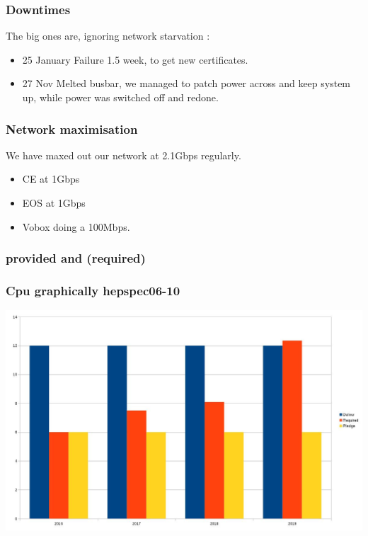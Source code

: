 \documentclass{beamer}
\begin{document}
\begin{frame}
\frametitle{Downtimes}
The big ones are, ignoring network starvation :
\begin{itemize}
    \item 25 January Failure 1.5 week, to get new certificates.
  \item 27 Nov Melted busbar, we managed to patch power across and keep system up, while power was switched off and redone.
\end{itemize}
\end{frame}

\begin{frame}
    \frametitle{Network maximisation}
    We have maxed out our network at 2.1Gbps regularly.
    \begin{itemize}
            \item CE at 1Gbps
                \item EOS at 1Gbps
                \item Vobox doing a 100Mbps.
    \end{itemize}
\end{frame} 

\begin{frame}
    \frametitle{provided and (required)}
\vspace{0.5cm}
\end{frame}

\begin{frame}
    \frametitle{Cpu graphically hepspec06-10}
    \includegraphics[scale=0.35]{CPUPledge-10.jpg}
\end{frame}
\end{document}
